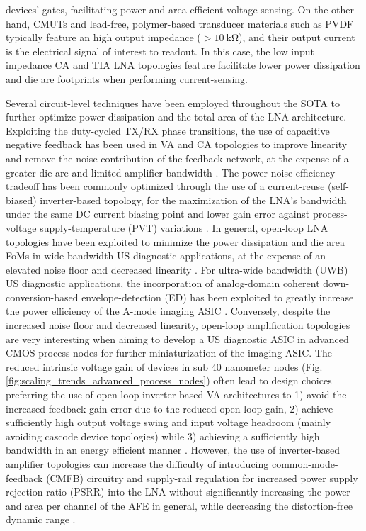 devices' gates, facilitating power and area efficient voltage-sensing. On the other hand, CMUTs and lead-free, polymer-based transducer materials such as PVDF typically feature an high output impedance ($\mathrm{>10 \ k\Omega}$), and their output current is the electrical signal of interest to readout. In this case, the low input impedance CA  \cite{} and TIA \cite{} LNA topologies feature facilitate lower power dissipation and die are footprints when performing current-sensing. 
\par 
Several circuit-level techniques have been employed throughout the SOTA to further optimize power dissipation and the total area of the LNA architecture. Exploiting the duty-cycled TX/RX phase transitions, the use of capacitive negative feedback has been used in VA and CA topologies to improve linearity and remove the noise contribution of the feedback network, at the expense of a greater die are and limited amplifier bandwidth \cite{}. The power-noise efficiency tradeoff has been commonly optimized through the use of a current-reuse (self-biased) inverter-based topology, for the maximization of the LNA's bandwidth under the same DC current biasing point and lower gain error against process-voltage supply-temperature (PVT) variations \cite{}. In general, open-loop LNA topologies have been exploited to minimize the power dissipation and die area FoMs in wide-bandwidth US diagnostic applications, at the expense of an elevated noise floor and decreased linearity \cite{}. For ultra-wide bandwidth (UWB) US diagnostic applications, the incorporation of analog-domain coherent down-conversion-based envelope-detection (ED) has been exploited to greatly increase the power efficiency of the A-mode imaging ASIC \cite{}.  Conversely, despite the increased noise floor and decreased linearity, open-loop amplification topologies are very interesting when aiming to develop a US diagnostic ASIC in advanced CMOS process nodes for further miniaturization of the imaging ASIC. The reduced intrinsic voltage gain of devices in sub 40 nanometer nodes (Fig. \ref{fig:scaling_trends_advanced_process_nodes}) often lead to design choices preferring the use of open-loop inverter-based VA architectures to 1) avoid the increased feedback gain error due to the reduced open-loop gain, 2) achieve sufficiently high output voltage swing and input voltage headroom (mainly avoiding cascode device topologies) while 3) achieving a sufficiently high bandwidth in an energy efficient manner \cite{}.  However, the use of inverter-based amplifier topologies can increase the difficulty of introducing common-mode-feedback (CMFB) circuitry and supply-rail regulation for increased power supply rejection-ratio (PSRR) into the LNA without significantly increasing the power and area per channel of the AFE in general, while decreasing the distortion-free dynamic range \cite{}. 
\par

